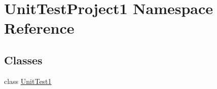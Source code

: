 \hypertarget{namespace_unit_test_project1}{}\section{Unit\+Test\+Project1 Namespace Reference}
\label{namespace_unit_test_project1}
\subsection*{Classes}
\begin{DoxyCompactItemize}
\item 
class \hyperlink{class_unit_test_project1_1_1_unit_test1}{Unit\+Test1}
\end{DoxyCompactItemize}
